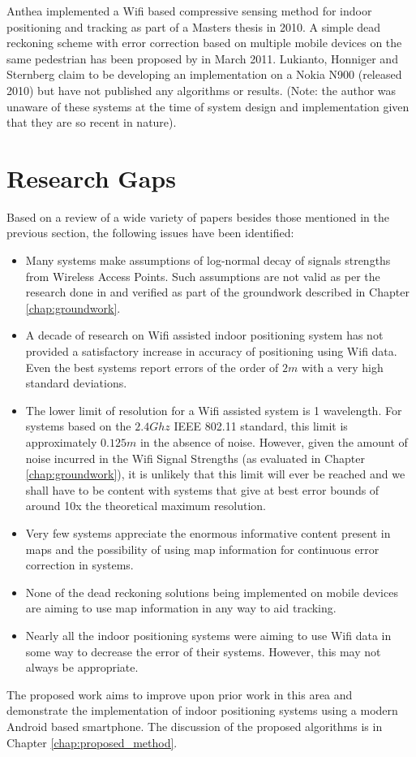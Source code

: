 Anthea \cite{Anthea} implemented a Wifi based compressive sensing method for indoor positioning and tracking as part of a Masters thesis in 2010. A simple dead reckoning scheme with error correction based on multiple mobile devices on the same pedestrian has been proposed by \cite{NUSJin} in March 2011. Lukianto, Honniger and Sternberg\cite{Lukianto} claim to be developing an implementation on a Nokia N900 (released 2010) but have not published any algorithms or results. (Note: the author was unaware of these systems at the time of system design and implementation given that they are so recent in nature).


\section{Research Gaps}

Based on a review of a wide variety of papers besides those mentioned in the previous section, the following issues have been identified:

\begin{itemize}
\item Many systems make assumptions of log-normal decay of signals strengths from Wireless Access Points. Such assumptions are not valid as per the research done in \cite{KStats} and verified as part of the groundwork described in Chapter \ref{chap:groundwork}.
\item A decade of research on Wifi assisted indoor positioning system has not provided a satisfactory increase in accuracy of positioning using Wifi data. Even the best systems report errors of the order of $2 m$ with a very high standard deviations.
\item The lower limit of resolution for a Wifi assisted system is 1 wavelength. For systems based on the $2.4 Ghz$ IEEE 802.11 standard, this limit is approximately $0.125 m$ in the absence of noise. However, given the amount of noise incurred in the Wifi Signal Strengths (as evaluated in Chapter \ref{chap:groundwork}), it is unlikely that this limit will ever be reached and we shall have to be content with systems that give at best error bounds of around 10x the theoretical maximum resolution.
\item Very few systems appreciate the enormous informative content present in maps and the possibility of using map information for continuous error correction in systems. 
\item None of the dead reckoning solutions being implemented on mobile devices are aiming to use map information in any way to aid tracking.
\item Nearly all the indoor positioning systems were aiming to use Wifi data in some way to decrease the error of their systems. However, this may not always be appropriate.
\end{itemize}

The proposed work aims to improve upon prior work in this area and demonstrate the implementation of indoor positioning systems using a modern Android based smartphone. The discussion of the proposed algorithms is in Chapter \ref{chap:proposed_method}.



